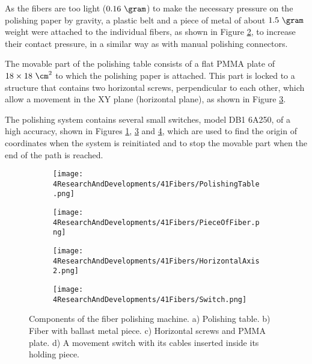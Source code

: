As the fibers are too light ($0.16~\gram$) to make the necessary pressure on the polishing paper by gravity, a plastic belt and a piece of metal of about $1.5~\gram$ weight were attached to the individual fibers, as shown in Figure \ref{subfig:FiberMetailcPiece}, to increase their contact pressure, in a similar way as with manual polishing connectors. 

The movable part of the polishing table consists of a flat PMMA plate of $18 \times 18~\cm^2$ to which the polishing paper is attached. This part is locked to a structure \cite{StructureAxis} that contains two horizontal screws, perpendicular to each other, which allow a movement in the XY plane (horizontal plane), as shown in Figure \ref{subfig:HorizontalAxis}.

The polishing system contains several small switches, model DB1 6A250, of a high accuracy, shown in Figures \ref{subfig:PolishingTable}, \ref{subfig:HorizontalAxis} and \ref{subfig:3DSwitchPiece}, which are used to find the origin of coordinates when the system is reinitiated and to stop the movable part when the end of the path is reached. 

\begin{figure}
\centering
    \begin{subfigure}[b]{0.55\textwidth}
    \centering
    \texttt{[image: 4ResearchAndDevelopments/41Fibers/PolishingTable.png]}  
    \caption{\label{subfig:PolishingTable}}
    \end{subfigure}
    \hfill
    \begin{subfigure}[b]{0.3\textwidth}
    \centering
    \texttt{[image: 4ResearchAndDevelopments/41Fibers/PieceOfFiber.png]}  
    \caption{\label{subfig:FiberMetailcPiece}}
    \end{subfigure}
    \hfill
    \begin{subfigure}[b]{0.55\textwidth}
    \centering
    \texttt{[image: 4ResearchAndDevelopments/41Fibers/HorizontalAxis2.png]}  
    \caption{\label{subfig:HorizontalAxis}}
    \end{subfigure}
    \hfill
    \begin{subfigure}[b]{0.4\textwidth}
    \centering
    \texttt{[image: 4ResearchAndDevelopments/41Fibers/Switch.png]}  
    \caption{\label{subfig:3DSwitchPiece}}
    \end{subfigure}
 \caption{Components of the fiber polishing machine. a) Polishing table. b) Fiber with ballast metal piece. c) Horizontal screws and PMMA plate. d) A movement switch with its cables inserted inside its holding piece.}
 \label{fig:PolishingTable}
\end{figure}

